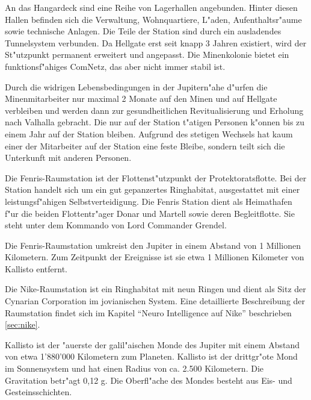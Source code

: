 An das Hangardeck sind eine Reihe von Lagerhallen angebunden. Hinter diesen Hallen befinden sich die Verwaltung, Wohnquartiere, L"aden, Aufenthaltsr"aume sowie technische Anlagen. Die Teile der Station sind durch ein ausladendes Tunnelsystem verbunden. Da Hellgate erst seit knapp 3 Jahren existiert, wird der St"utzpunkt permanent erweitert und angepasst. Die Minenkolonie bietet ein funktionsf"ahiges ComNetz, das aber nicht immer stabil ist.

Durch die widrigen Lebensbedingungen in der Jupitern"ahe d"urfen die Minenmitarbeiter nur maximal 2 Monate auf den Minen und auf Hellgate verbleiben und werden dann zur gesundheitlichen Revitualisierung und Erholung nach Valhalla gebracht. Die nur auf der Station t"atigen Personen k"onnen bis zu einem Jahr auf der Station bleiben. Aufgrund des stetigen Wechsels hat kaum einer der Mitarbeiter auf der Station eine feste Bleibe, sondern teilt sich die Unterkunft mit anderen Personen.

Die Fenris-Raumstation ist der Flottenst"utzpunkt der Protektoratsflotte. Bei der Station handelt sich um ein gut gepanzertes Ringhabitat, ausgestattet mit einer leistungsf"ahigen Selbstverteidigung. Die Fenris Station dient als Heimathafen f"ur die beiden Flottentr"ager Donar und Martell sowie deren Begleitflotte. Sie steht unter dem Kommando von Lord Commander Grendel.

Die Fenris-Raumstation umkreist den Jupiter in einem Abstand von 1 Millionen Kilometern. Zum Zeitpunkt der Ereignisse ist sie etwa 1 Millionen Kilometer von Kallisto entfernt.


Die Nike-Raumstation ist ein Ringhabitat mit neun Ringen und dient als Sitz der Cynarian Corporation im jovianischen System. Eine detaillierte Beschreibung der Raumstation findet sich im Kapitel ``Neuro Intelligence auf Nike'' beschrieben \cref{sec:nike}.

\clearpage\newpage



Kallisto ist der "au\3erste der galil"aischen Monde des Jupiter mit einem Abstand von etwa  1'880'000 Kilometern zum Planeten. Kallisto ist der drittgr"o\3te Mond im Sonnensystem und hat einen Radius von ca. 2.500 Kilometern. Die Gravitation betr"agt 0,12 g.  Die Oberfl"ache des Mondes besteht aus Eis- und Gesteinsschichten.

